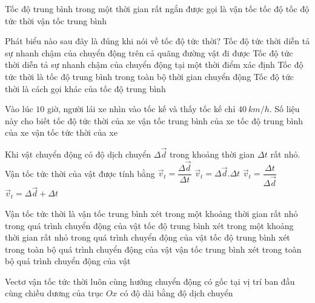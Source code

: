 \begin{ex}%
Tốc độ trung bình trong một thời gian rất ngắn được gọi là
\choice
{vận tốc}
{tốc độ}
{\True tốc độ tức thời}
{vận tốc trung bình}
\loigiai{

}
\end{ex}
\begin{ex}%
Phát biểu nào sau đây là đúng khi nói về tốc độ tức thời?
\choice
{Tốc độ tức thời diễn tả sự nhanh chậm của chuyển động trên cả quãng đường vật đi được}
{\True Tốc độ tức thời diễn tả sự nhanh chậm của chuyển động tại một thời điểm xác định}
{Tốc độ tức thời là tốc độ trung bình trong toàn bộ thời gian chuyển động}
{Tốc độ tức thời là cách gọi khác của tốc độ trung bình}

\loigiai{
}
 \end{ex}
\begin{ex}%
Vào lúc $10$ giờ, người lái xe nhìn vào tốc kế và thấy tốc kế chỉ $40\ km/h$. Số liệu này cho biết
\choice
{\True tốc độ tức thời của xe}
{vận tốc trung bình của xe}
{tốc độ trung bình của xe}
{vận tốc tức thời của xe}
\loigiai{
}
 \end{ex}
\begin{ex}%
Khi vật chuyển động có độ dịch chuyển $\Delta \overrightarrow{d}$ trong khoảng thời gian $\Delta t$ rất nhỏ. Vận tốc tức thời của vật được tính bằng
\choice
{\True $\overrightarrow{v}_t=\dfrac{\Delta \overrightarrow{d}}{\Delta t}$}
{$\overrightarrow{v}_t=\Delta \overrightarrow{d}. \Delta t$}
{$\overrightarrow{v}_t=\dfrac{\Delta t}{\Delta \vec{d}}$}
{$\overrightarrow{v}_t=\Delta \overrightarrow{d}+\Delta t$}

\loigiai{
}
 \end{ex}
\begin{ex}%
Vận tốc tức thời là
\choice
{\True vận tốc trung bình xét trong một khoảng thời gian rất nhỏ trong quá trình chuyển động của vật}
{tốc độ trung bình xét trong một khoảng thời gian rất nhỏ trong quá trình chuyển động của vật}
{tốc độ trung bình xét trong toàn bộ quá trình chuyển động của vật}
{vận tốc trung bình xét trong toàn bộ quá trình chuyển động của vật}
\loigiai{
}
\end{ex}
\begin{ex}%
Vectơ vận tốc tức thời
\choice
{\True luôn cùng hướng chuyển động}
{có gốc tại vị trí ban đầu}
{cùng chiều dương của trục $Ox$}
{có độ dài bằng độ dịch chuyển}

\loigiai{
}
 \end{ex}
